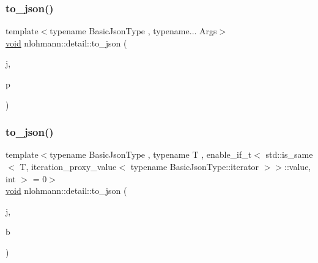 \subsubsection{\texorpdfstring{to\_json()}{to\_json()}\hspace{0.1cm}{\footnotesize\ttfamily [15/17]}}
{\footnotesize\ttfamily template$<$typename Basic\+Json\+Type , typename... Args$>$ \\
\mbox{\hyperlink{namespacenlohmann_1_1detail_a59fca69799f6b9e366710cb9043aa77d}{void}} nlohmann\+::detail\+::to\+\_\+json (\begin{DoxyParamCaption}\item[{Basic\+Json\+Type \&}]{j,  }\item[{const std\+::pair$<$ Args... $>$ \&}]{p }\end{DoxyParamCaption})}

\mbox{\label{namespacenlohmann_1_1detail_aaa77b0c9745130b77733a92a1a2e82ec}} 
\subsubsection{\texorpdfstring{to\_json()}{to\_json()}\hspace{0.1cm}{\footnotesize\ttfamily [16/17]}}
{\footnotesize\ttfamily template$<$typename Basic\+Json\+Type , typename T , enable\+\_\+if\+\_\+t$<$ std\+::is\+\_\+same$<$ T, iteration\+\_\+proxy\+\_\+value$<$ typename Basic\+Json\+Type\+::iterator $>$$>$\+::value, int $>$  = 0$>$ \\
\mbox{\hyperlink{namespacenlohmann_1_1detail_a59fca69799f6b9e366710cb9043aa77d}{void}} nlohmann\+::detail\+::to\+\_\+json (\begin{DoxyParamCaption}\item[{Basic\+Json\+Type \&}]{j,  }\item[{const \mbox{\hyperlink{_keyboard_event_8h_adf1f3edb9115acb0a1e04209b7a9937b}{T}} \&}]{b }\end{DoxyParamCaption})}

\mbox{\label{namespacenlohmann_1_1detail_aa7a47b08eee864c2c108c04954919648}} 
